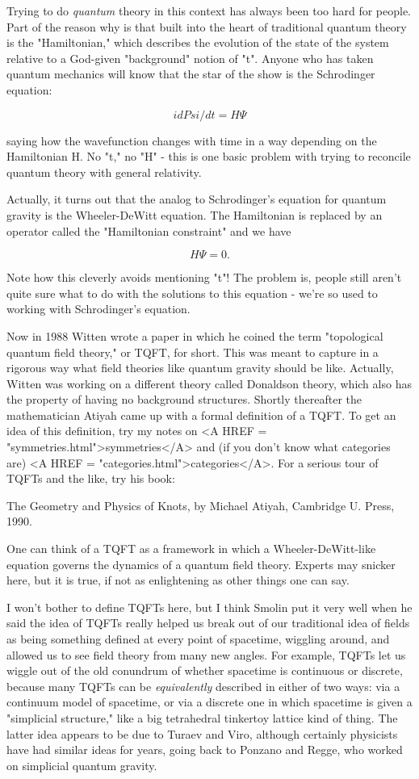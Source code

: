 Trying to do \emph{quantum} theory in this context has always been too hard
for people.  Part of the reason why is that built into the heart of
traditional quantum theory is the "Hamiltonian," which describes the
evolution of the state of the system relative to a God-given
"background" notion of "t".  Anyone who has taken quantum mechanics will
know that the star of the show is the Schrodinger equation:

$$
                      i dPsi/dt = H \Psi 
$$
    

saying how the wavefunction \Psi  changes with time in a way depending on
the Hamiltonian H.  No "t," no "H" - this is one basic problem with
trying to reconcile quantum theory with general relativity.

Actually, it turns out that the analog to Schrodinger's equation for
quantum gravity is the Wheeler-DeWitt equation.  The Hamiltonian is
replaced by an operator called the "Hamiltonian constraint" and we have

$$
                         H \Psi  = 0.
$$
    

Note how this cleverly avoids mentioning "t"!  The problem is, people
still aren't quite sure what to do with the solutions to this equation -
we're so used to working with Schrodinger's equation.

Now in 1988 Witten wrote a paper in which he coined the term
"topological quantum field theory," or TQFT, for short.  This was meant
to capture in a rigorous way what field theories like quantum gravity
should be like.  Actually, Witten was working on a different theory
called Donaldson theory, which also has the property of having no
background structures.  Shortly thereafter the mathematician Atiyah came
up with a formal definition of a TQFT.   To get an idea of this
definition, try my notes on <A HREF = "symmetries.html">symmetries</A> and 
(if you don't know what categories are) <A HREF = "categories.html">categories</A>.
For a serious tour of TQFTs and the like, try his book:

The Geometry and Physics of Knots, by Michael Atiyah, Cambridge U.
Press, 1990.

One can think of a TQFT as a framework in which a Wheeler-DeWitt-like
equation governs the dynamics of a quantum field theory.  Experts may
snicker here, but it is true, if not as enlightening as other things one
can say.  

I won't bother to define TQFTs here, but I think Smolin put it very well
when he said the idea of TQFTs really helped us break out of our
traditional idea of fields as being something defined at every point of
spacetime, wiggling around, and allowed us to see field theory from many
new angles.  For example, TQFTs let us wiggle out of the old conundrum
of whether spacetime is continuous or discrete, because many TQFTs can
be \emph{equivalently} described in either of two ways: via a continuum model
of spacetime, or via a discrete one in which spacetime is given a
"simplicial structure," like a big tetrahedral tinkertoy lattice kind of
thing.  The latter idea appears to be due to Turaev and Viro, although
certainly physicists have had similar ideas for years, going back to
Ponzano and Regge, who worked on simplicial quantum gravity.

